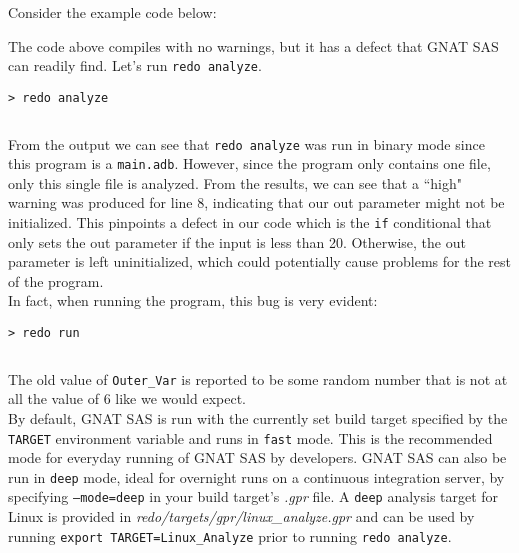 Consider the example code below:


The code above compiles with no warnings, but it has a defect that GNAT SAS can readily find. Let's run \texttt{redo analyze}.

\vspace{5mm} %
\begin{verbatim}
> redo analyze
\end{verbatim}
\inputminted{text}{../example_architecture/analyze_demo/output.txt}
\vspace{5mm} %

From the output we can see that \texttt{redo analyze} was run in binary mode since this program is a \texttt{main.adb}. However, since the program only contains one file, only this single file is analyzed. From the results, we can see that a ``high" warning was produced for line 8, indicating that our out parameter might not be initialized. This pinpoints a defect in our code which is the \texttt{if} conditional that only sets the out parameter if the input is less than 20. Otherwise, the out parameter is left uninitialized, which could potentially cause problems for the rest of the program. \\

In fact, when running the program, this bug is very evident:

\vspace{5mm} %
\begin{verbatim}
> redo run 
\end{verbatim}
\inputminted{text}{../example_architecture/analyze_demo/output2.txt}
\vspace{5mm} %

The old value of \texttt{Outer\_Var} is reported to be some random number that is not at all the value of 6 like we would expect. \\

By default, GNAT SAS is run with the currently set build target specified by the \texttt{TARGET} environment variable and runs in \texttt{fast} mode. This is the recommended mode for everyday running of GNAT SAS by developers. GNAT SAS can also be run in \texttt{deep} mode, ideal for overnight runs on a continuous integration server, by specifying \texttt{---mode=deep} in your build target's \textit{.gpr} file. A \texttt{deep} analysis target for Linux is provided in \textit{redo/targets/gpr/linux\_analyze.gpr} and can be used by running \texttt{export TARGET=Linux\_Analyze} prior to running \texttt{redo analyze}. \\

